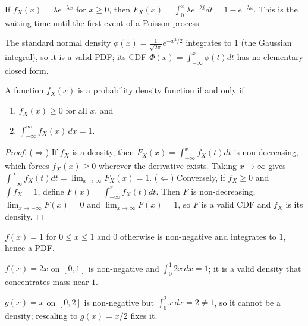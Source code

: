 \documentclass[a4paper, 12pt]{book}
\begin{document}
\begin{example}
    If $f_X(x)=\lambda e^{-\lambda x}$ for $x\geq0$, then $F_X(x)=\int_0^x\lambda e^{-\lambda t}dt=1-e^{-\lambda x}$. This is the waiting time until the first event of a Poisson process.
\end{example}

\begin{example}
    The standard normal density $\phi(x)=\frac{1}{\sqrt{2\pi}}e^{-x^2/2}$ integrates to $1$ (the Gaussian integral), so it is a valid PDF; its CDF $\Phi(x)=\int_{-\infty}^x\phi(t)dt$ has no elementary closed form.
\end{example}

\begin{theorem}
    A function $f_X(x)$ is a probability density function if and only if
    \begin{enumerate}
        \item $f_X(x) \geq 0$ for all $x$, and
        \item $\int_{-\infty}^\infty f_X(x)\,dx = 1$.
    \end{enumerate}
\end{theorem}
\begin{proof}
    ($\Rightarrow$) If $f_X$ is a density, then $F_X(x)=\int_{-\infty}^x f_X(t)dt$ is non-decreasing, which forces $f_X(x)\geq0$ wherever the derivative exists. Taking $x\to\infty$ gives $\int_{-\infty}^\infty f_X(t)dt=\lim_{x\to\infty}F_X(x)=1$.
    ($\Leftarrow$) Conversely, if $f_X\geq0$ and $\int f_X=1$, define $F(x)=\int_{-\infty}^x f_X(t)dt$. Then $F$ is non-decreasing, $\lim_{x\to-\infty}F(x)=0$ and $\lim_{x\to\infty}F(x)=1$, so $F$ is a valid CDF and $f_X$ is its density.
\end{proof}
\begin{example}
    $f(x)=1$ for $0\leq x\leq1$ and $0$ otherwise is non-negative and integrates to $1$, hence a PDF.
\end{example}

\begin{example}
    $f(x)=2x$ on $[0,1]$ is non-negative and $\int_0^1 2x\,dx=1$; it is a valid density that concentrates mass near $1$.
\end{example}

\begin{example}
    $g(x)=x$ on $[0,2]$ is non-negative but $\int_0^2 x\,dx=2\neq1$, so it cannot be a density; rescaling to $g(x)=x/2$ fixes it.
\end{example}
\end{document}
